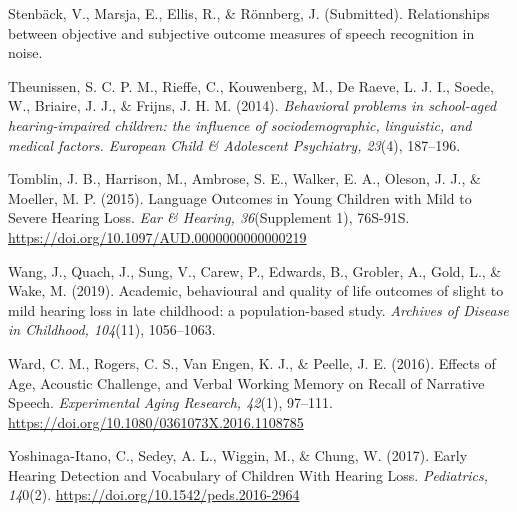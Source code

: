 \documentclass[]{article}
\begin{document}
Stenbäck, V., Marsja, E., Ellis, R., \& Rönnberg, J. (Submitted).
Relationships between objective and subjective outcome measures of
speech recognition in noise.

Theunissen, S. C. P. M., Rieffe, C., Kouwenberg, M., De Raeve, L. J. I.,
Soede, W., Briaire, J. J., \& Frijns, J. H. M. (2014). \emph{Behavioral
problems in school-aged hearing-impaired children: the influence of
sociodemographic, linguistic, and medical factors. European Child \&
Adolescent Psychiatry, 23}(4), 187--196.

Tomblin, J. B., Harrison, M., Ambrose, S. E., Walker, E. A., Oleson, J.
J., \& Moeller, M. P. (2015). Language Outcomes in Young Children with
Mild to Severe Hearing Loss. \emph{Ear \& Hearing, 36}(Supplement 1),
76S-91S. \url{https://doi.org/10.1097/AUD.0000000000000219}

Wang, J., Quach, J., Sung, V., Carew, P., Edwards, B., Grobler, A.,
Gold, L., \& Wake, M. (2019). Academic, behavioural and quality of life
outcomes of slight to mild hearing loss in late childhood: a
population-based study. \emph{Archives of Disease in Childhood,
104}(11), 1056--1063.

Ward, C. M., Rogers, C. S., Van Engen, K. J., \& Peelle, J. E. (2016).
Effects of Age, Acoustic Challenge, and Verbal Working Memory on Recall
of Narrative Speech. \emph{Experimental Aging Research, 42}(1), 97--111.
\url{https://doi.org/10.1080/0361073X.2016.1108785}

Yoshinaga-Itano, C., Sedey, A. L., Wiggin, M., \& Chung, W. (2017).
Early Hearing Detection and Vocabulary of Children With Hearing Loss.
\emph{Pediatrics, 14}0(2). \url{https://doi.org/10.1542/peds.2016-2964}
\end{document}
